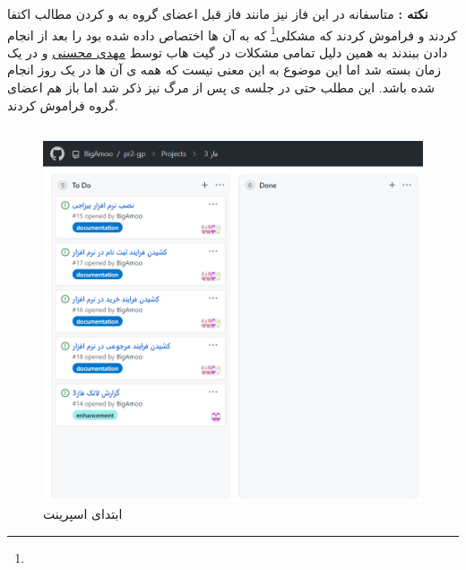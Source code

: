 \documentclass[12pt,a4paper]{article}
\begin{document}
\textbf{نکته :} متاسفانه در این فاز نیز مانند فاز قبل اعضای گروه به  و  کردن مطالب اکتفا کردند و فراموش کردند که مشکلی\footnote{} که به آن ها اختصاص داده شده بود را بعد از انجام دادن ببندند به همین دلیل تمامی مشکلات در گیت هاب توسط \underline{مهدی محسنی} و در یک زمان بسته شد اما این موضوع به این معنی نیست که همه ی آن ها در یک روز انجام شده باشد. این مطلب حتی در جلسه ی پس از مرگ نیز ذکر شد اما باز هم اعضای گروه فراموش کردند.
\pagebreak

\subsection{} \label{section.report.taskBoard}

\begin{figure}[h!]
	\begin{center}
		\includegraphics[width=14cm]{images/screenshot_7.png}	
	\end{center}
	\caption{ابتدای اسپرینت}
\end{figure}
\end{document}
